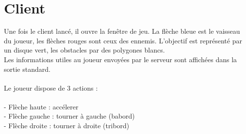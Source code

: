 \documentclass{article}
\begin{document}
\section{Client}

Une fois le client lancé, il ouvre la fenêtre de jeu.
La flèche bleue est le vaisseau du joueur, les flèches rouges sont ceux des ennemis. L'objectif est représenté par un disque vert,
les obstacles par des polygones blancs.\\
Les informations utiles au joueur envoyées par le serveur sont affichées dans la sortie standard.\\
\\
Le joueur dispose de 3 actions :\\
\\
- Flèche haute : accélerer\\
- Flèche gauche : tourner à gauche (babord)\\
- Flèche droite : tourner à droite (tribord)\\
\end{document}
